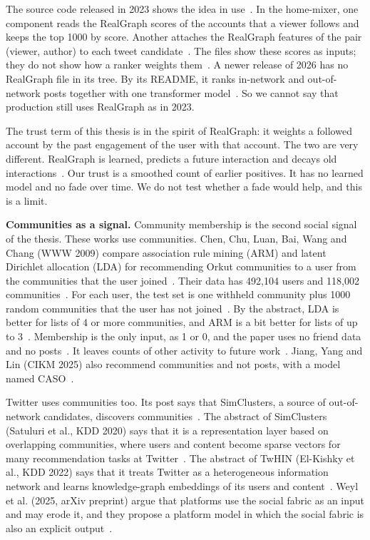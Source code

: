The source code released in 2023 shows the idea in use~. In the home-mixer, one component reads the RealGraph scores of the accounts that a viewer follows and keeps the top 1000 by score. Another attaches the RealGraph features of the pair (viewer, author) to each tweet candidate~. The files show these scores as inputs; they do not show how a ranker weights them~. A newer release of 2026 has no RealGraph file in its tree. By its README, it ranks in-network and out-of-network posts together with one transformer model~. So we cannot say that production still uses RealGraph as in 2023.

The trust term of this thesis is in the spirit of RealGraph: it weights a followed account by the past engagement of the user with that account. The two are very different. RealGraph is learned, predicts a future interaction and decays old interactions~. Our trust is a smoothed count of earlier positives. It has no learned model and no fade over time. We do not test whether a fade would help, and this is a limit.

\textbf{Communities as a signal.} Community membership is the second social signal of the thesis. These works use communities. Chen, Chu, Luan, Bai, Wang and Chang (WWW 2009) compare association rule mining (ARM) and latent Dirichlet allocation (LDA) for recommending Orkut communities to a user from the communities that the user joined~. Their data has 492,104 users and 118,002 communities~. For each user, the test set is one withheld community plus 1000 random communities that the user has not joined~. By the abstract, LDA is better for lists of 4 or more communities, and ARM is a bit better for lists of up to 3~. Membership is the only input, as 1 or 0, and the paper uses no friend data and no posts~. It leaves counts of other activity to future work~. Jiang, Yang and Lin (CIKM 2025) also recommend communities and not posts, with a model named CASO~.

Twitter uses communities too. Its post says that SimClusters, a source of out-of-network candidates, discovers communities~. The abstract of SimClusters (Satuluri et al., KDD 2020) says that it is a representation layer based on overlapping communities, where users and content become sparse vectors for many recommendation tasks at Twitter~. The abstract of TwHIN (El-Kishky et al., KDD 2022) says that it treats Twitter as a heterogeneous information network and learns knowledge-graph embeddings of its users and content~. Weyl et al. (2025, arXiv preprint) argue that platforms use the social fabric as an input and may erode it, and they propose a platform model in which the social fabric is also an explicit output~.


